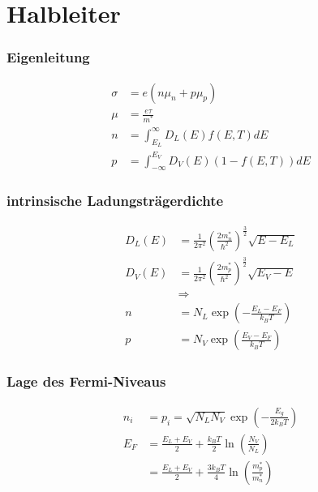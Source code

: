 \section{Halbleiter}

\subsubsection*{Eigenleitung}
\begin{equation*}
    \begin{aligned}
        \sigma &= e (n \mu_n + p \mu_p) \\
        \mu &= \frac{e \tau}{m^*} \\
        n &= \int_{E_L}^\infty D_L(E) f(E,T) dE \\
        p &= \int_{-\infty}^{E_V} D_V(E) (1-f(E,T)) dE
    \end{aligned}
\end{equation*}

\subsubsection*{intrinsische Ladungsträgerdichte}
\begin{equation*}
    \begin{aligned}
        D_L(E) &= \frac{1}{2 \pi^2} \left(\frac{2 m_n^*}{\hbar^2}\right)^{\frac{3}{2}} \sqrt{E-E_L} \\
        D_V(E) &= \frac{1}{2 \pi^2} \left(\frac{2 m_p^*}{\hbar^2}\right)^{\frac{3}{2}} \sqrt{E_V-E} \\
        & \Rightarrow \\
        n &= N_L \exp\left(-\frac{E_L-E_F}{k_B T}\right) \\
        p &= N_V \exp\left(\frac{E_V - E_F}{k_B T}\right)
    \end{aligned}
\end{equation*}

\subsubsection*{Lage des Fermi-Niveaus}
\begin{equation*}
    \begin{aligned}
        n_i &= p_i = \sqrt{N_L N_V} \exp \left(- \frac{E_g}{2 k_B T}\right) \\
        E_F &= \frac{E_L + E_V}{2} + \frac{k_B T}{2} \ln \left(\frac{N_V}{N_L}\right) \\
            &= \frac{E_L + E_V}{2} + \frac{3 k_B T}{4} \ln \left(\frac{m_p^*}{m_n^*}\right)
    \end{aligned}
\end{equation*}